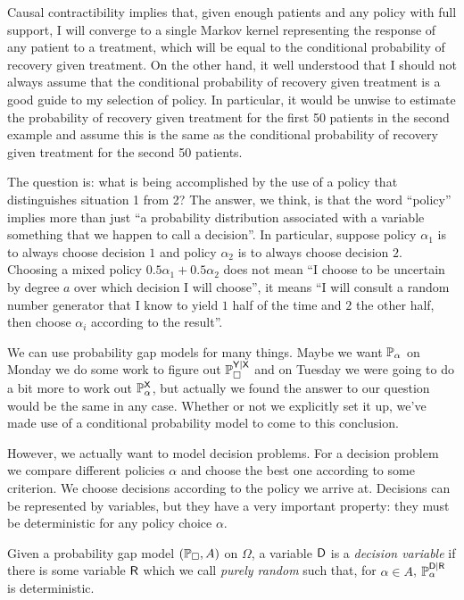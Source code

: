 Causal contractibility implies that, given enough patients and any policy with full support, I will converge to a single Markov kernel representing the response of any patient to a treatment, which will be equal to the conditional probability of recovery given treatment. On the other hand, it well understood that I should not always assume that the conditional probability of recovery given treatment is a good guide to my selection of policy. In particular, it would be unwise to estimate the probability of recovery given treatment for the first 50 patients in the second example and assume this is the same as the conditional probability of recovery given treatment for the second 50 patients.

The question is: what is being accomplished by the use of a policy that distinguishes situation 1 from 2? The answer, we think, is that the word ``policy'' implies more than just ``a probability distribution associated with a variable something that we happen to call a decision''. In particular, suppose policy $\alpha_1$ is to always choose decision $1$ and policy $\alpha_2$ is to always choose decision $2$. Choosing a mixed policy $0.5\alpha_1 + 0.5\alpha_2$ does not mean ``I choose to be uncertain by degree $a$ over which decision I will choose'', it means ``I will consult a random number generator that I know to yield $1$ half of the time and $2$ the other half, then choose $\alpha_i$ according to the result''. 



We can use probability gap models for many things. Maybe we want $\mathbb{P}_\alpha$ on Monday we do some work to figure out $\mathbb{P}_\square^{\mathsf{Y}|\mathsf{X}}$ and on Tuesday we were going to do a bit more to work out $\mathbb{P}_\alpha^{\mathsf{X}}$, but actually we found the answer to our question would be the same in any case. Whether or not we explicitly set it up, we've made use of a conditional probability model to come to this conclusion.

However, we actually want to model decision problems. For a decision problem we compare different policies $\alpha$ and choose the best one according to some criterion. We choose decisions according to the policy we arrive at. Decisions can be represented by variables, but they have a very important property: they must be deterministic for any policy choice $\alpha$.

\begin{definition}
Given a probability gap model $(\mathbb{P}_\square, A)$ on $\Omega$, a variable $\mathsf{D}$ is a \emph{decision variable} if there is some variable $\mathsf{R}$ which we call \emph{purely random} such that, for $\alpha\in A$, $\mathbb{P}_\alpha^{\mathsf{D}|\mathsf{R}}$ is deterministic.
\end{definition}

